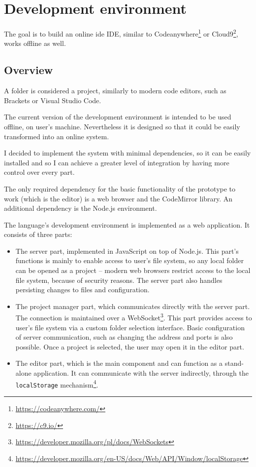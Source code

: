\chapter{Development environment}\label{chap:editor}
The goal is to build an online \acrlong{ide} IDE, similar to Codeanywhere\footnote{\url{https://codeanywhere.com/}} or Cloud9\footnote{\url{https://c9.io/}}, works offline as well.

\section{Overview}
A folder is considered a project, similarly to modern code editors, such as Brackets or Visual Studio Code.

The current version of the development environment is intended to be used offline, on user's machine. Nevertheless it is designed so that it could be easily transformed into an online system.

I decided to implement the system with minimal dependencies, so it can be easily installed and so I can achieve a greater level of integration by having more control over every part.

The only required dependency for the basic functionality of the prototype to work (which is the editor) is a web browser and the CodeMirror library. An additional dependency is the Node.js environment.

The language's development environment is implemented as a web application. It consists of three parts:
\begin{itemize}
    \item The server part, implemented in JavaScript on top of Node.js. This part's functions is mainly to enable access to user's file system, so any local folder can be opened as a project -- modern web browsers restrict access to the local file system, because of security reasons. The server part also handles persisting changes to files and configuration.
    \item The project manager part, which communicates directly with the server part. The connection is maintained over a WebSocket\footnote{\url{https://developer.mozilla.org/pl/docs/WebSockets}}. This part provides access to user's file system via a custom folder selection interface. Basic configuration of server communication, such as changing the address and ports is also possible. Once a project is selected, the user may open it in the editor part.
    \item The editor part, which is the main component and can function as a stand-alone application. It can communicate with the server indirectly, through the \texttt{localStorage} mechanism\footnote{\url{https://developer.mozilla.org/en-US/docs/Web/API/Window/localStorage}}.
\end{itemize}


